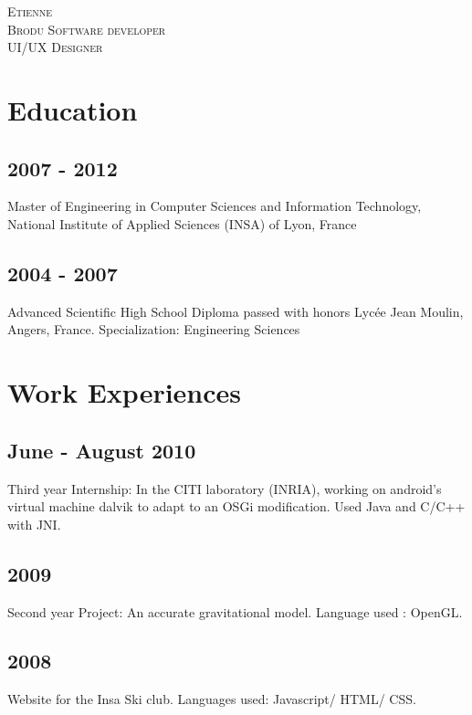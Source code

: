 
\usepackage[english]{babel}


\pagestyle{empty}

	{
		\textsc{Etienne}\\
		\textsc{Brodu}
	}
	{
		\textsc{Software developer}\\
		\textsc{UI/UX Designer}
	}
	
	
	
\section{Education}
	\subsection{2007 - 2012}
		{Master of Engineering in Computer Sciences and Information Technology, National Institute of Applied Sciences (INSA) of Lyon, France}
		
	\subsection{2004 - 2007}
		{Advanced Scientific High School Diploma passed with honors Lyc\'{e}e Jean Moulin, Angers, France. Specialization: Engineering Sciences}

\section{Work Experiences}
	\subsection{June - August 2010}
		{Third year Internship: In the CITI laboratory (INRIA), working on android's virtual machine dalvik to adapt to an OSGi modification. Used Java and C/C++ with JNI.}

	\subsection{2009}
		{Second year Project: An accurate gravitational model. Language used : OpenGL.}
		
	\subsection{2008}
		{Website for the Insa Ski club. Languages used: Javascript/ HTML/ CSS.}
				
